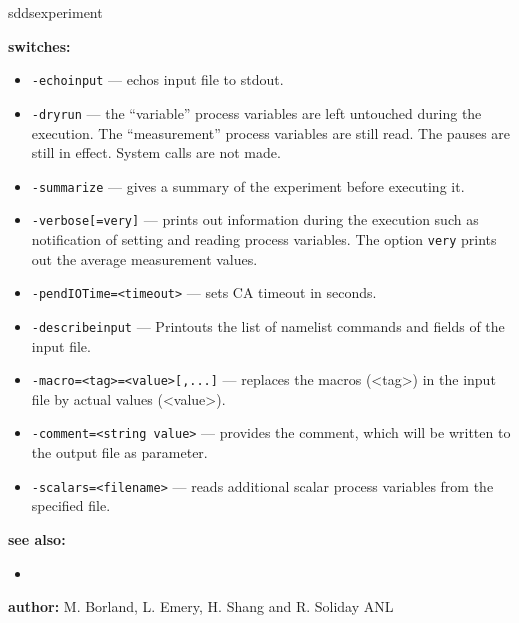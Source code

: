 \begin{sddsprog}{sddsexperiment}
\item \textbf{switches:}
\begin{itemize}
  \item {\verb+-echoinput+} --- echos input file to stdout.
  \item {\verb+-dryrun+} --- the ``variable'' process variables are left untouched during the execution. The ``measurement''
                process variables are still read. The pauses are still in effect. System calls are not made.
  \item {\verb+-summarize+} --- gives a summary of the experiment before executing it.
  \item {\verb+-verbose[=very]+} --- prints out information during the execution such as notification of
                setting and reading process variables. The option \verb+very+ prints out the average measurement values.
  \item {\verb+-pendIOTime=<timeout>+} --- sets CA timeout in seconds.
  \item {\verb+-describeinput+} --- Printouts the list of namelist commands and fields of the input file.
  \item {\verb+-macro=<tag>=<value>[,...]+} --- replaces the macros (<tag>) in the input file by actual values (<value>).
  \item {\verb+-comment=<string value>+} --- provides the comment, which will be written to the output file as parameter.
  \item {\verb+-scalars=<filename>+} --- reads additional scalar process variables from the specified file.
\end{itemize}

\item \textbf{see also:}
\begin{itemize}
  \item {}
\end{itemize}
\item \textbf{author:} M. Borland, L. Emery, H. Shang and R. Soliday ANL
\end{sddsprog}
